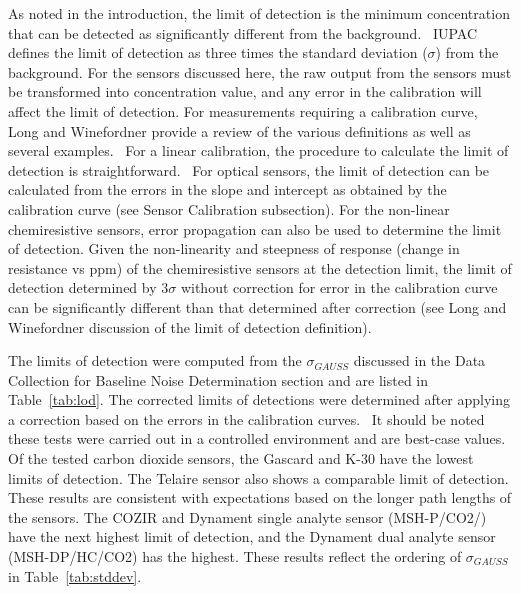 \documentclass[times]{joehreview}
\begin{document}
	As noted in the introduction, the limit of detection is the minimum concentration that can be detected as significantly different from the background.~\cite{long_limit_1983,currie_detection:_1997,mocak_j._statistical_2009}   IUPAC defines the limit of detection as three times the standard deviation ($\sigma$) from the background.    For the sensors discussed here, the raw output from the sensors must be transformed into concentration value, and any error in the calibration will affect the limit of detection. For measurements requiring a calibration curve, Long and Winefordner provide a review of the various definitions as well as several examples.~\cite{long_limit_1983}  For a linear calibration, the procedure to calculate the limit of detection is straightforward.~\cite{long_limit_1983}  For optical sensors, the limit of detection can be calculated from the errors in the slope and intercept as obtained by the calibration curve (see Sensor Calibration subsection).  For the non-linear chemiresistive sensors, error propagation can also be used to determine the limit of detection. Given the non-linearity and steepness of response (change in resistance vs ppm) of the chemiresistive sensors at the detection limit, the limit of detection determined by $3\sigma$ without correction for error in the calibration curve can be significantly different than that determined after correction (see Long and Winefordner discussion of the limit of detection definition).~\cite{long_limit_1983}
	
	The limits of detection were computed from the $\sigma_{GAUSS}$ discussed in the Data Collection for Baseline Noise Determination section and are listed in Table~\ref{tab:lod}.  The corrected limits of detections were determined after applying a correction based on the errors in the calibration curves.~\cite{long_limit_1983}  It should be noted these tests were carried out in a controlled environment and are best-case values.  Of the tested carbon dioxide sensors, the Gascard and K-30 have the lowest limits of detection.  The Telaire sensor also shows a comparable limit of detection.  These results are consistent with expectations based on the longer path lengths of the sensors. The COZIR and Dynament single analyte sensor (MSH-P/CO2/) have the next highest limit of detection, and the Dynament dual analyte sensor (MSH-DP/HC/CO2) has the highest.  These results reflect the ordering of $\sigma_{GAUSS}$ in Table~\ref{tab:stddev}.
	
\end{document}

